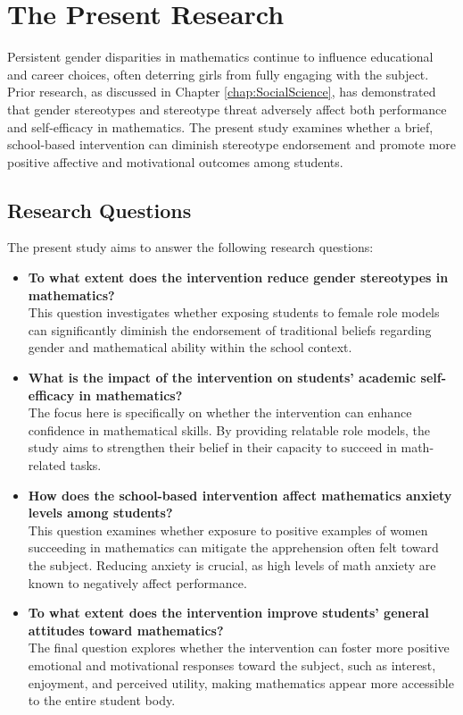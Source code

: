 \chapter{The Present Research}\label{chap:PresentResearch}
Persistent gender disparities in mathematics continue to influence educational and career choices, often deterring girls from fully engaging with the subject. Prior research, as discussed in Chapter \ref{chap:SocialScience}, has demonstrated that gender stereotypes and stereotype threat adversely affect both performance and self-efficacy in mathematics. The present study examines whether a brief, school-based intervention can diminish stereotype endorsement and promote more positive affective and motivational outcomes among students.
\section{Research Questions}
The present study aims to answer the following research questions:

\begin{itemize}
    \item[RQ1.] \textbf{To what extent does the intervention reduce gender stereotypes in mathematics?} \\
    This question investigates whether exposing students to female role models can significantly diminish the endorsement of traditional beliefs regarding gender and mathematical ability within the school context.

    \item[RQ2.] \textbf{What is the impact of the intervention on students' academic self-efficacy in mathematics?} \\
    The focus here is specifically on whether the intervention can enhance confidence in mathematical skills. By providing relatable role models, the study aims to strengthen their belief in their capacity to succeed in math-related tasks.

    \item[RQ3.] \textbf{How does the school-based intervention affect mathematics anxiety levels among students?} \\
    This question examines whether exposure to positive examples of women succeeding in mathematics can mitigate the apprehension often felt toward the subject. Reducing anxiety is crucial, as high levels of math anxiety are known to negatively affect performance.

    \item[RQ4.] \textbf{To what extent does the intervention improve students' general attitudes toward mathematics?} \\
    The final question explores whether the intervention can foster more positive emotional and motivational responses toward the subject, such as interest, enjoyment, and perceived utility, making mathematics appear more accessible to the entire student body.
\end{itemize}

